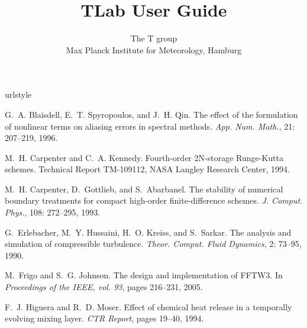 \documentclass[a4paper,11pt]{book}
\title{{\bf T}\textcolor{black!50}{Lab} User Guide}
\author{The T group\\[1ex]
{\small Max Planck Institute for Meteorology, Hamburg}
}
\begin{document}
\frontmatter
\pagestyle{empty}
\maketitle
\tableofcontents

\setlength{\parskip}{0.5\baselineskip}


\mainmatter
\pagestyle{fancy}









\backmatter


%
\begin{thebibliography}{20}
\providecommand{\natexlab}[1]{#1}
\providecommand{\url}[1]{\texttt{#1}}
\expandafter\ifx\csname urlstyle\endcsname\relax
  \providecommand{\doi}[1]{doi: #1}\else
  \providecommand{\doi}{doi: \begingroup \urlstyle{rm}\Url}\fi

G.~A. Blaisdell, E.~T. Spyropoulos, and J.~H. Qin.
\newblock The effect of the formulation of nonlinear terms on aliasing errors
  in spectral methods.
\newblock \emph{App. Num. Math.}, 21: 207--219, 1996.

M.~H. Carpenter and C.~A. Kennedy.
\newblock Fourth-order 2{N}-storage {R}unge-{K}utta schemes.
\newblock Technical Report TM-109112, NASA Langley Research Center, 1994.

M.~H. Carpenter, D.~Gottlieb, and S.~Abarbanel.
\newblock The stability of numerical boundary treatments for compact high-order
  finite-difference schemes.
\newblock \emph{J. Comput. Phys.}, 108: 272--295, 1993.

G.~Erlebacher, M.~Y. Hussaini, H.~O. Kreiss, and S.~Sarkar.
\newblock The analysis and simulation of compressible turbulence.
\newblock \emph{Theor. Comput. Fluid Dynamics}, 2: 73--95, 1990.

M.~Frigo and S.~G. Johnson.
\newblock The design and implementation of {FFTW3}.
\newblock In \emph{Proceedings of the {IEEE}, vol. 93}, pages 216--231, 2005.

F.~J. Higuera and R.~D. Moser.
\newblock Effect of chemical heat release in a temporally evolving mixing
  layer.
\newblock \emph{CTR Report}, pages 19--40, 1994.


\end{thebibliography}
\end{document}
